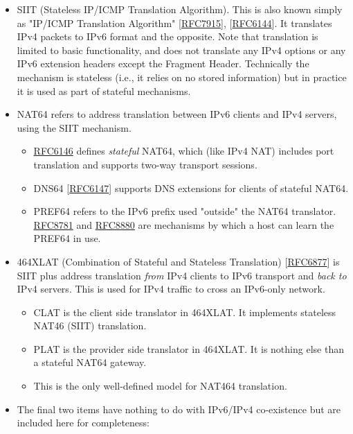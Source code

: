 \documentclass[
]{article}
\providecommand{\tightlist}{%
  \setlength{\itemsep}{0pt}\setlength{\parskip}{0pt}}
\begin{document}
\begin{itemize}
\item
  SIIT (Stateless IP/ICMP Translation Algorithm). This is also known
  simply as "IP/ICMP Translation Algorithm"
  {[}\href{https://www.rfc-editor.org/info/rfc7915}{RFC7915}{]},
  {[}\href{https://www.rfc-editor.org/info/rfc6144}{RFC6144}{]}. It
  translates IPv4 packets to IPv6 format and the opposite. Note that
  translation is limited to basic functionality, and does not translate
  any IPv4 options or any IPv6 extension headers except the Fragment
  Header. Technically the mechanism is stateless (i.e., it relies on no
  stored information) but in practice it is used as part of stateful
  mechanisms.
\item
  NAT64 refers to address translation between IPv6 clients and IPv4
  servers, using the SIIT mechanism.

  \begin{itemize}
  \tightlist
  \item
    \href{https://www.rfc-editor.org/info/rfc6146}{RFC6146} defines
    \emph{stateful} NAT64, which (like IPv4 NAT) includes port
    translation and supports two-way transport sessions.
  \item
    DNS64 {[}\href{https://www.rfc-editor.org/info/rfc6147}{RFC6147}{]}
    supports DNS extensions for clients of stateful NAT64.
  \item
    PREF64 refers to the IPv6 prefix used "outside" the NAT64
    translator. \href{https://www.rfc-editor.org/info/rfc8781}{RFC8781}
    and \href{https://www.rfc-editor.org/info/rfc8880}{RFC8880} are
    mechanisms by which a host can learn the PREF64 in use.
  \end{itemize}
\item
  464XLAT (Combination of Stateful and Stateless Translation)
  {[}\href{https://www.rfc-editor.org/info/rfc6877}{RFC6877}{]} is SIIT
  plus address translation \emph{from} IPv4 clients to IPv6 transport
  and \emph{back to} IPv4 servers. This is used for IPv4 traffic to
  cross an IPv6-only network.

  \begin{itemize}
  \tightlist
  \item
    CLAT is the client side translator in 464XLAT. It implements
    stateless NAT46 (SIIT) translation.
  \item
    PLAT is the provider side translator in 464XLAT. It is nothing else
    than a stateful NAT64 gateway.
  \item
    This is the only well-defined model for NAT464 translation.
  \end{itemize}
\item
  The final two items have nothing to do with IPv6/IPv4 co-existence but
  are included here for completeness:


\end{itemize}
\end{document}
